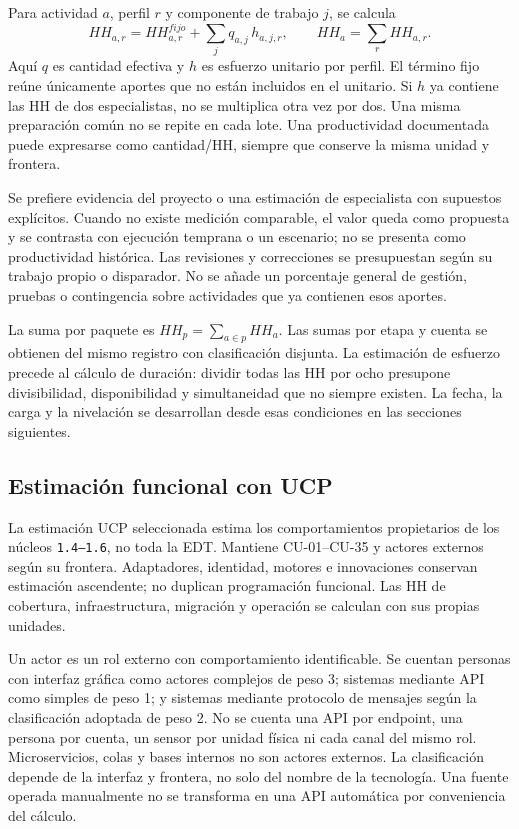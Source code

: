 Para actividad $a$, perfil $r$ y componente de trabajo $j$, se calcula
\[
HH_{a,r}=HH^{fijo}_{a,r}+\sum_j q_{a,j}\,h_{a,j,r},
\qquad HH_a=\sum_r HH_{a,r}.
\]
Aquí $q$ es cantidad efectiva y $h$ es esfuerzo unitario por perfil. El término fijo reúne únicamente aportes que no están incluidos en el unitario. Si $h$ ya contiene las HH de dos especialistas, no se multiplica otra vez por dos. Una misma preparación común no se repite en cada lote. Una productividad documentada puede expresarse como cantidad/HH, siempre que conserve la misma unidad y frontera.

Se prefiere evidencia del proyecto o una estimación de especialista con supuestos explícitos. Cuando no existe medición comparable, el valor queda como propuesta y se contrasta con ejecución temprana o un escenario; no se presenta como productividad histórica. Las revisiones y correcciones se presupuestan según su trabajo propio o disparador. No se añade un porcentaje general de gestión, pruebas o contingencia sobre actividades que ya contienen esos aportes.

La suma por paquete es $HH_p=\sum_{a\in p}HH_a$. Las sumas por etapa y cuenta se obtienen del mismo registro con clasificación disjunta. La estimación de esfuerzo precede al cálculo de duración: dividir todas las HH por ocho presupone divisibilidad, disponibilidad y simultaneidad que no siempre existen. La fecha, la carga y la nivelación se desarrollan desde esas condiciones en las secciones siguientes.

\subsection{Estimación funcional con UCP}
La estimación UCP seleccionada estima los comportamientos propietarios de los núcleos \texttt{1.4--1.6}, no toda la EDT. Mantiene CU-01--CU-35 y actores externos según su frontera. Adaptadores, identidad, motores e innovaciones conservan estimación ascendente; no duplican programación funcional. Las HH de cobertura, infraestructura, migración y operación se calculan con sus propias unidades.

Un actor es un rol externo con comportamiento identificable. Se cuentan personas con interfaz gráfica como actores complejos de peso 3; sistemas mediante API como simples de peso 1; y sistemas mediante protocolo de mensajes según la clasificación adoptada de peso 2. No se cuenta una API por endpoint, una persona por cuenta, un sensor por unidad física ni cada canal del mismo rol. Microservicios, colas y bases internos no son actores externos. La clasificación depende de la interfaz y frontera, no solo del nombre de la tecnología. Una fuente operada manualmente no se transforma en una API automática por conveniencia del cálculo.

